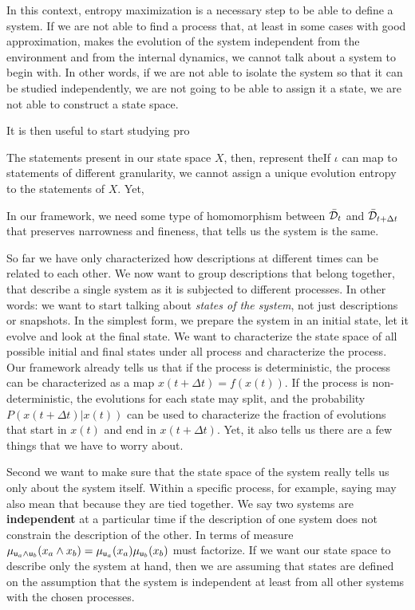 \documentclass[letterpaper]{article}
\begin{document}
In this context, entropy maximization is a necessary step to be able to define a system. If we are not able to find a process that, at least in some cases with good approximation, makes the evolution of the system independent from the environment and from the internal dynamics, we cannot talk about a system to begin with. In other words, if we are not able to isolate the system so that it can be studied independently, we are not going to be able to assign it a state, we are not able to construct a state space.

It is then useful to start studying pro


The statements present in our state space $X$, then, represent theIf $\iota$ can map to statements of different granularity, we cannot assign a unique evolution entropy to the statements of $X$. Yet, 

 In our framework, we need some type of homomorphism between $\tdomain_t$ and $\tdomain_{t + \Delta t}$ that preserves narrowness and fineness, that tells us the system is the same.



So far we have only characterized how descriptions at different times can be related to each other. We now want to group descriptions that belong together, that describe a single system as it is subjected to different processes. In other words: we want to start talking about \textit{states of the system}, not just descriptions or snapshots. In the simplest form, we prepare the system in an initial state, let it evolve and look at the final state. We want to characterize the state space of all possible initial and final states under all process and characterize the process. Our framework already tells us that if the process is deterministic, the process can be characterized as a map $x(t+\Delta t) = f(x(t))$. If the process is non-deterministic, the evolutions for each state may split, and the probability $P(x(t + \Delta t) | x(t))$ can be used to characterize the fraction of evolutions that start in $x(t)$ and end in $x(t+\Delta t)$. Yet, it also tells us there are a few things that we have to worry about.

Second we want to make sure that the state space of the system really tells us only about the system itself. Within a specific process, for example, saying  may also mean that  because they are tied together. We say two systems are \textbf{independent} at a particular time if the description of one system does not constrain the description of the other. In terms of measure $\mu_{\stmt[u]_a \AND \stmt[u]_b}(x_a \AND x_b) = \mu_{\stmt[u]_a}(x_a) \mu_{\stmt[u]_b}(x_b)$ must factorize. If we want our state space to describe only the system at hand, then we are assuming that states are defined on the assumption that the system is independent at least from all other systems with the chosen processes.
\end{document}
